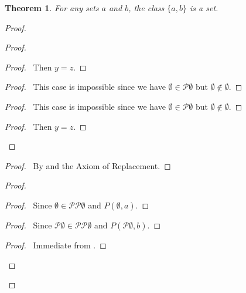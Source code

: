 \documentclass{book}
\let\qed\relax
\newtheorem{thm}[prop]{Theorem}
\theoremstyle{definition}
\begin{document}
\begin{thm}
    For any sets $a$ and $b$, the class $\{a,b\}$ is a set.
\end{thm}

\begin{proof}
    \pf
    \begin{proof}
        \begin{proof}
            \pf\ Then $y = z$.
        \end{proof}
        \begin{proof}
            \pf\ This case is impossible since we have $\emptyset \in \mathcal{P} \emptyset$ but $\emptyset \notin \emptyset$.
        \end{proof}
        \begin{proof}
            \pf\ This case is impossible since we have $\emptyset \in \mathcal{P} \emptyset$ but $\emptyset \notin \emptyset$.
        \end{proof}
        \begin{proof}
            \pf\ Then $y = z$.
        \end{proof}
    \end{proof}
    \begin{proof}
        \pf\ By  and the Axiom of Replacement.
    \end{proof}
    \begin{proof}
        \begin{proof}
            \pf\ Since $\emptyset \in \mathcal{P} \mathcal{P} \emptyset$ and $P(\emptyset, a)$.
        \end{proof}
        \begin{proof}
            \pf\ Since $\mathcal{P} \emptyset \in \mathcal{P} \mathcal{P} \emptyset$ and $P(\mathcal{P} \emptyset, b)$.
        \end{proof}
        \begin{proof}
            \pf\ Immediate from .
        \end{proof}
    \end{proof}
    \qed
\end{proof}
\end{document}
